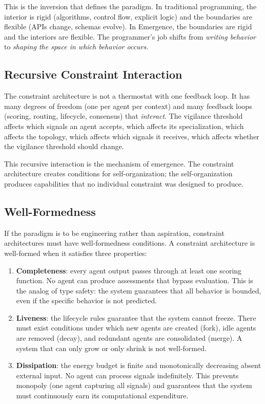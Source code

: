 \documentclass[11pt,twocolumn]{article}
\begin{document}
This is the inversion that defines the paradigm.  In traditional
programming, the interior is rigid (algorithms, control flow, explicit
logic) and the boundaries are flexible (APIs change, schemas evolve).
In Emergence, the boundaries are rigid and the interiors are flexible.
The programmer's job shifts from \emph{writing behavior} to
\emph{shaping the space in which behavior occurs.}

\subsection{Recursive Constraint Interaction}

The constraint architecture is not a thermostat with one feedback loop.
It has many degrees of freedom (one per agent per context) and many
feedback loops (scoring, routing, lifecycle, consensus) that
\emph{interact}.  The vigilance threshold affects which signals an agent
accepts, which affects its specialization, which affects the topology,
which affects which signals it receives, which affects whether the
vigilance threshold should change.

This recursive interaction is the mechanism of emergence.  The
constraint architecture creates conditions for self-organization; the
self-organization produces capabilities that no individual constraint
was designed to produce.

\subsection{Well-Formedness}

If the paradigm is to be engineering rather than aspiration, constraint
architectures must have well-formedness conditions.  A constraint
architecture is well-formed when it satisfies three properties:

\begin{enumerate}[nosep]
  \item \textbf{Completeness}: every agent output passes through at
    least one scoring function.  No agent can produce assessments that
    bypass evaluation.  This is the analog of type safety: the system
    guarantees that all behavior is bounded, even if the specific
    behavior is not predicted.
  \item \textbf{Liveness}: the lifecycle rules guarantee that the
    system cannot freeze.  There must exist conditions under which new
    agents are created (fork), idle agents are removed (decay), and
    redundant agents are consolidated (merge).  A system that can only
    grow or only shrink is not well-formed.
  \item \textbf{Dissipation}: the energy budget is finite and
    monotonically decreasing absent external input.  No agent can
    process signals indefinitely.  This prevents monopoly (one agent
    capturing all signals) and guarantees that the system must
    continuously earn its computational expenditure.
\end{enumerate}
\end{document}
